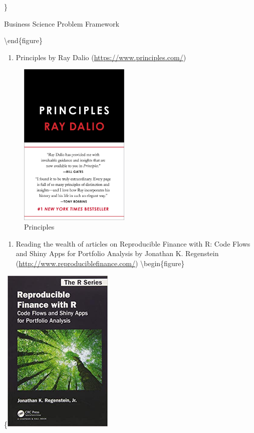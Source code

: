 \documentclass[
]{article}
\providecommand{\tightlist}{%
  \setlength{\itemsep}{0pt}\setlength{\parskip}{0pt}}
\begin{document}
\}

\caption{Business Science Problem Framework}\label{fig:unnamed-chunk-2}

\textbackslash end\{figure\}

\begin{enumerate}
\def\labelenumi{\arabic{enumi}.}
\setcounter{enumi}{1}
\tightlist
\item
  Principles by Ray Dalio (\url{https://www.principles.com/})
\end{enumerate}

\begin{figure}

{\centering \includegraphics[width=200px]{Images/Principles Ray Dalio} 

}

\caption{Principles}\label{fig:unnamed-chunk-3}
\end{figure}

\begin{enumerate}
\def\labelenumi{\arabic{enumi}.}
\setcounter{enumi}{2}
\tightlist
\item
  Reading the wealth of articles on Reproducible Finance with R: Code
  Flows and Shiny Apps for Portfolio Analysis by Jonathan K. Regenstein
  (\url{http://www.reproduciblefinance.com/})
  \textbackslash begin\{figure\}
\end{enumerate}

\{\centering \includegraphics[width=200px]{Images/Reproducible Finance with R}
\end{document}
